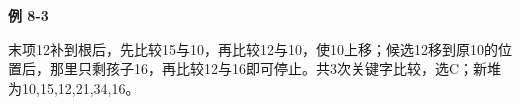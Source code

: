 {\color{ink}\bfseries 例 8-3}\par\vspace{1bp}末项12补到根后，先比较15与10，再比较12与10，使10上移；候选12移到原10的位置后，那里只剩孩子16，再比较12与16即可停止。共3次关键字比较，选C；新堆为10,\allowbreak{}15,\allowbreak{}12,\allowbreak{}21,\allowbreak{}34,\allowbreak{}16。
